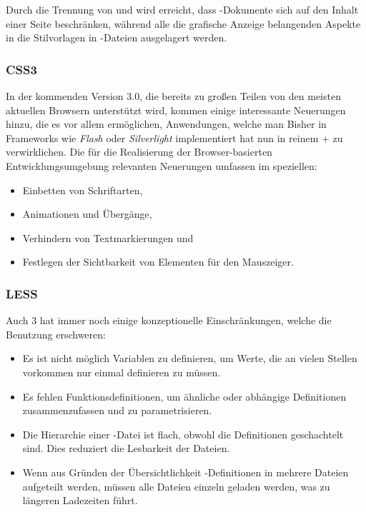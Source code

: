 Durch die Trennung von  und  wird erreicht, dass -Dokumente sich auf
den Inhalt einer Seite beschränken, während alle die grafische Anzeige  belangenden Aspekte in die
Stilvorlagen in -Dateien ausgelagert  werden.

\subsubsection{CSS3}
\label{sec:css3}

In der kommenden  Version 3.0, die bereits zu großen Teilen von den meisten aktuellen
Browsern unterstützt wird, kommen einige interessante Neuerungen hinzu, die es vor allem
ermöglichen, Anwendungen, welche man Bisher in Frameworks wie \textit{Flash} oder
\textit{Silverlight} implementiert hat nun in reinem + zu verwirklichen. Die für
die Realisierung der Browser-basierten Entwicklungsumgebung relevanten Neuerungen umfassen im
speziellen:

\begin{itemize}
  \item Einbetten von Schriftarten,
  \item Animationen und Übergänge,
  \item Verhindern von Textmarkierungen und
  \item Festlegen der Sichtbarkeit von Elementen für den Mauszeiger.
\end{itemize}

\subsubsection{LESS}

\label{sec:less}

Auch 3 hat immer noch einige konzeptionelle Einschränkungen, welche die Benutzung
erschweren:

\begin{itemize} 
  \item Es ist nicht möglich Variablen zu definieren, um Werte, die an
vielen Stellen vorkommen nur einmal definieren zu müssen. 
  \item Es fehlen Funktionsdefinitionen, um ähnliche
oder abhängige Definitionen  zusammenzufassen und zu parametrisieren. 
  \item Die Hierarchie einer
-Datei ist flach, obwohl die Definitionen geschachtelt sind. Dies reduziert die Lesbarkeit
der Dateien. 
  \item Wenn aus Gründen der Übersichtlichkeit -Definitionen in mehrere Dateien aufgeteilt
werden, müssen alle Dateien einzeln geladen werden, was zu längeren Ladezeiten führt. \end{itemize}

